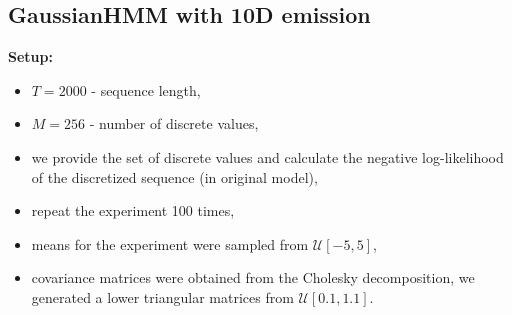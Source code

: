 \documentclass[shortabstract]{iithesis}
\begin{document}








\subsection{GaussianHMM with 10D emission} \label{sec:ex_gauss_10d}

\textbf{Setup:}
\begin{itemize}
    \item $T = 2000$ - sequence length,
    \item $M = 256$ - number of  discrete values,
    \item we provide the set of discrete values and calculate the negative log-likelihood of the discretized sequence (in original model),
    \item repeat the experiment 100 times,
    \item means for the experiment were sampled from $\mathcal U[-5,  5]$,
    \item covariance matrices were obtained from the Cholesky decomposition, we generated a lower triangular matrices from $\mathcal U[0.1,  1.1]$.
\end{itemize}
\end{document}
